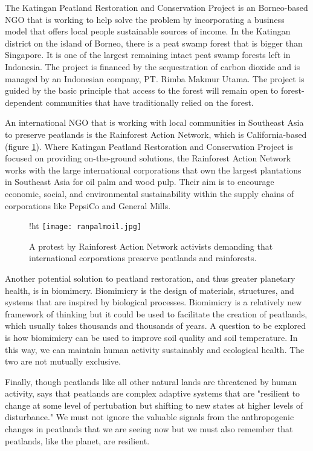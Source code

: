 The Katingan Peatland Restoration and Conservation Project is an Borneo-based NGO that is working to help solve the problem by incorporating a business model that offers local people sustainable sources of income. In the Katingan district on the island of Borneo, there is a peat swamp forest that is bigger than Singapore. It is one of the largest remaining intact peat swamp forests left in Indonesia. The project is financed by the sequestration of carbon dioxide and is managed by an Indonesian company, PT. Rimba Makmur Utama. The project is guided by the basic principle that access to the forest will remain open to forest-dependent communities that have traditionally relied on the forest.

An international NGO that is working with local communities in Southeast Asia to preserve peatlands is the Rainforest Action Network, which is California-based (figure \ref{fig:ranpalmoil}). Where Katingan Peatland Restoration and Conservation Project is focused on providing on-the-ground solutions, the Rainforest Action Network works with the large international corporations that own the largest plantations in Southeast Asia for oil palm and wood pulp. Their aim is to encourage economic, social, and environmental sustainability within the supply chains of corporations like PepsiCo and General Mills.

\begin{figure}{!ht}
  \texttt{[image: ranpalmoil.jpg]}
  \caption{A protest by Rainforest Action Network activists demanding that international corporations preserve peatlands and rainforests.}
  \label{fig:ranpalmoil}
\end{figure}

Another potential solution to peatland restoration, and thus greater planetary health, is in biomimcry. Biomimicry is the design of materials, structures, and systems that are inspired by biological processes. Biomimicry is a relatively new framework of thinking but it could be used to facilitate the creation of peatlands, which usually takes thousands and thousands of years. A question to be explored is how biomimicry can be used to improve soil quality and soil temperature. In this way, we can maintain human activity sustainably and ecological health. The two are not mutually exclusive.  

Finally, though peatlands like all other natural lands are threatened by human activity, \citet{dise2009peatland} says that peatlands are complex adaptive systems that are "resilient to change at some level of pertubation but shifting to new states at higher levels of disturbance." We must not ignore the valuable signals from the anthropogenic changes in peatlands that we are seeing now but we must also remember that peatlands, like the planet, are resilient.  

